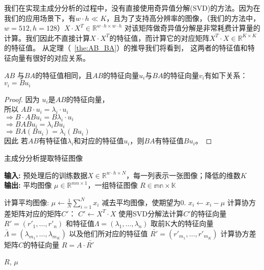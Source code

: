         我们在实现主成分分析的过程中，没有直接使用奇异值分解(SVD)的方法。因为在我们的应用场景下，有$w\cdot h \ll K$，且为了支持高分辨率的图像，（我们的方法中，$w = 512, h = 128$）$X\cdot X^T \in \mathbb{R}^{w\cdot h \times w\cdot h}$ 对该矩阵做奇异值分解是非常耗费计算量的计算。我们因此不直接计算$X\cdot  X^T$的特征值，而计算它的对应矩阵$X^T \cdot X \in \mathbb{R} ^{K \times K}$的特征值。 从定理（~\ref{the:AB_BA}）的推导我们将看到， 这两者的特征值和特征向量有很好的对应关系。

        \begin{theorem}\label{the:AB_BA}
            $AB$ 与$BA$的特征值相同，且$AB$的特征向量$u_i$与$BA$的特征向量$v_i$有如下关系：$v_i = Bu_i$
        \end{theorem}
        \begin{proof}
        
            因为 $u_i$是$AB$的特征向量，\\
            所以  $AB \cdot u_i = \lambda_i \cdot u_i$\\
            $\Rightarrow B\cdot AB u_i = B \lambda_i \cdot u_i$\\
            $\Rightarrow BAB u_i = \lambda_i B u_i$\\
            $\Rightarrow BA(Bu_i)= \lambda_i (Bu_i)$\\
            因此 若$AB$有特征值$\lambda_i$和对应的特征值$u_i$，则$BA$有特征值$Bu_i$。
        
        \end{proof}


        \begin{algorithm}[t]
        \caption[主成分分析提取特征图像]{主成分分析提取特征图像\cite{turk1991eigenfaces}} %
        \hspace*{0.02in} {\bf 输入:} %
        预处理后的训练数据$X \in \mathbb{R}^{w\cdot h \times N}$，每一列表示一张图像；降低的维数$K$ \\
        \hspace*{0.02in} {\bf 输出:} %
        平均图像 $\mu \in \mathbb{R}^{mn\times 1}$，一组特征图像 $R \in \mathbb{mn \times K}$
        \begin{algorithmic}[1]
        \State 计算平均图像: $\mu \leftarrow \frac{1}{N} \sum_{i=1}^N x_i$ %
        \State 减去平均图像，使期望为0. $x_i \leftarrow x_i - \mu$
        \State 计算协方差矩阵对应的矩阵$C'$： $C' \leftarrow X^T \cdot X$
        \State 使用SVD分解法计算$C'$的特征向量 $R' = (r'_1, \dots, r'_n)$ 和特征值$\Lambda = (\lambda_1, \dots, \lambda_n)$
        \State 取前K大的特征向量 $\bar{\Lambda} = (\lambda_{m_1}, \dots, \lambda_{m_K})$ 以及他们所对应的特征值 $\bar {R'} = (r'_{m_1}, \dots, r'_{m_K})$
        \State 计算协方差矩阵$C$的特征向量 $R = A \cdot \bar{R'}$

        \State \Return $R$, $\mu$
        \end{algorithmic}
        \label{alg:eigenOCT}
        \end {algorithm}


